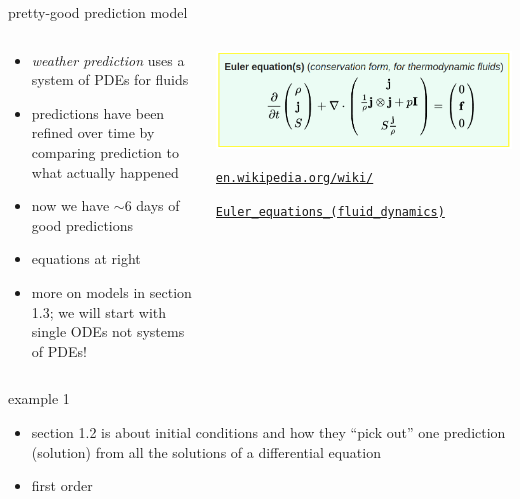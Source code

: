 \documentclass{beamer}
\begin{document}
\begin{frame}{pretty-good prediction model}

\begin{columns}
\begin{column}{0.5\textwidth}
\begin{itemize}
\item \emph{weather prediction} uses a system of PDEs for fluids
\item predictions have been refined over time by comparing prediction to what actually happened
\item now we have $\sim$6 days of good predictions
\item equations at right
\item more on models in section 1.3; we will start with single ODEs not systems of PDEs!
\end{itemize}
\end{column}
\begin{column}{0.5\textwidth}
\includegraphics[width=\textwidth]{figs/euler-equations}

\medskip

\quad \tiny \href{https://en.wikipedia.org/wiki/Euler_equations_(fluid_dynamics)}{\texttt{en.wikipedia.org/wiki/}}

\qquad \href{https://en.wikipedia.org/wiki/Euler_equations_(fluid_dynamics)}{\texttt{Euler\_equations\_(fluid\_dynamics)}}
\end{column}
\end{columns}
\end{frame}


\begin{frame}{example 1}

\begin{itemize}
\item section 1.2 is about initial conditions and how they ``pick out'' one prediction (solution) from all the solutions of a differential equation
\item first order
\end{itemize}
\end{frame}
\end{document}
